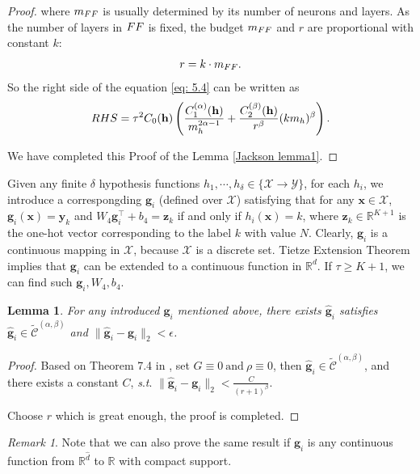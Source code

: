 \documentclass{article}
\theoremstyle{plain}
\newtheorem{lemma}[theorem]{Lemma}
\theoremstyle{definition}
\theoremstyle{remark}
\newtheorem{remark}[theorem]{Remark}
\begin{document}
\begin{proof}
    where $m_{\rm FF}$ is usually determined by its number of neurons and layers.
    As the number of layers in ${\rm FF}$ is fixed, the budget $m_{\rm FF}$ and $r$ are proportional with constant $k$:
    \begin{equation}
        r = k\cdot m_{\rm FF}.
    \end{equation}
    So the right side of the equation \eqref{eq: 5.4} can be written as 
    \begin{equation}
        {\rm RHS} = \tau^2 C_0(\mathbf{h} )\left(\frac{C_1^{(\alpha)}(\mathbf{h} )}{m_h^{2\alpha-1}}+\frac{C_2^{(\beta )}(\mathbf{h})}{r^{\beta}}(km_h)^{\beta}\right).
    \end{equation}
    
    We have completed this Proof of the Lemma \ref{Jackson lemma1}.
\end{proof}

Given any finite $\delta$ hypothesis functions $h_1,\cdots,h_{\delta}\in \{\mathcal{X}\xrightarrow{}\mathcal{Y}\}$, for each $h_i$, we introduce a correspongding $\mathbf{g}_i$ (defined over $\mathcal{X}$) satisfying that for any $\mathbf{x}\in \mathcal{X}$, $\mathbf{g}_i(\mathbf{x})=\mathbf{y}_k$ and $W_4\mathbf{g}_i^{\top}+b_4=\mathbf{z}_k$ if and only if $h_i(\mathbf{x})=k$, where $\mathbf{z}_k \in \mathbb{R}^{K+1}$ is the one-hot vector corresponding to the label $k$ with value $N$. Clearly, $\mathbf{g}_i$ is a continuous mapping in $\mathcal{X}$, because $\mathcal{X}$ is a discrete set. Tietze Extension Theorem \citep{urysohn1925machtigkeit} implies that $\mathbf{g}_i$ can be extended to a continuous function in $\mathbb{R}^d$. If $\tau \geq K+1$, we can find such $\mathbf{g}_i, W_4, b_4$.


\begin{lemma}
    For any introduced $\mathbf{g}_i$ mentioned above, there exists $\hat{\mathbf{g}}_i$ satisfies $\hat{\mathbf{g}}_i \in \widetilde{\mathcal{C}}^{(\alpha, \beta)}$ and $\|\hat{\mathbf{g}}_i-\mathbf{g}_i\|_2<\epsilon$.
    \label{Lemma 4}
\end{lemma}

\begin{proof}
    Based on Theorem 7.4 in \citet{devore2021neural}, set $G\equiv0 ~\text{and} ~\rho\equiv0$, then $\hat{\mathbf{g}}_i\in \widetilde{\mathcal{C}}^{(\alpha, \beta)}$, and there exists a constant $C$, \textit{s}.\textit{t}. $\|\hat{\mathbf{g}}_i-\mathbf{g}_i\|_2<\frac{C}{(r+1)^{\beta}}$. 
    
    Choose $r$ which is great enough, the proof is completed.
\end{proof}
\begin{remark}
    Note that we can also prove the same result if $\mathbf{g}_i$ is any continuous function from $\mathbb{R}^{\hat{d}}$ to $\mathbb{R}$ with compact support.
\end{remark}
      
\end{document}
